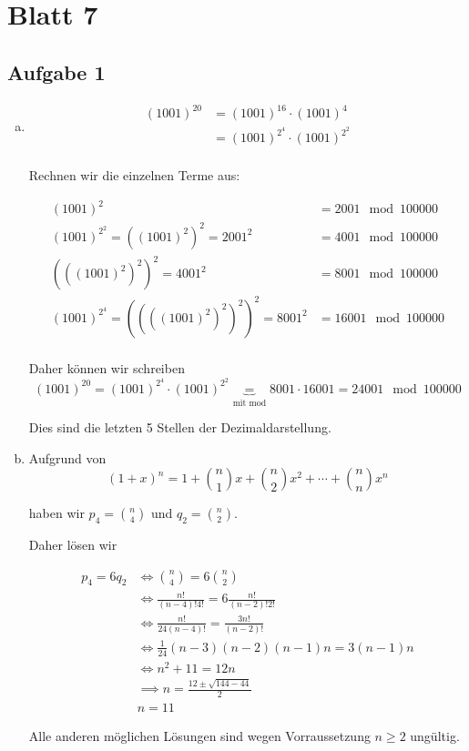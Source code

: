 \section*{Blatt 7}
%

\subsection*{Aufgabe 1}
\begin{enumerate}[a)]
\item
\begin{align*}
 (1001)^{20} &= (1001)^{16} \cdot (1001)^{4}\\
             &= (1001)^{2^{4}} \cdot (1001)^{2^{2}}\\
\end{align*}

Rechnen wir die einzelnen Terme aus:

\begin{align*}
  (1001)^2 &= 2001 \mod 100000 \\
  (1001)^{2^{2}} = ((1001)^2)^2 = 2001^2 &= 4001 \mod 100000 \\
  (((1001)^2)^2)^2 = 4001^2 &= 8001 \mod 100000 \\
  (1001)^{2^{4}} = ((((1001)^2)^2)^2)^2 = 8001^2 &= 16001 \mod 100000 \\
\end{align*}

Daher können wir schreiben
\[  (1001)^{20} = (1001)^{2^{4}} \cdot (1001)^{2^{2}} \underbrace{=}_{\text{mit mod}} 8001 \cdot 16001 = 24001 \mod 100000 \]

Dies sind die letzten 5 Stellen der Dezimaldarstellung.


\item

Aufgrund von \[ (1+x)^n = 1 + \binom{n}{1}x + \binom{n}{2}x^2 + \cdots + \binom{n}{n} x^n  \]

haben wir $p_4 = \binom{n}{4} $ und $q_2= \binom{n}{2}  $.

Daher lösen wir

\begin{align*}
p_4 = 6q_2 &\iff \binom{n}{4} = 6 \binom{n}{2} \\
           &\iff \frac{n!}{ (n-4)! 4! } =  6 \frac{n!}{(n-2)! 2!}\\
           &\iff \frac{n!}{24(n-4)!} = \frac{3n!}{(n-2)!} \\
           &\iff \frac{1}{24} (n-3)(n-2)(n-1)n = 3(n-1)n \\
           &\iff n^2 + 11 = 12n \\
           &\implies n = \frac{12 \pm \sqrt{144 - 44}}{2} \\
           &n = 11
\end{align*}

Alle anderen möglichen Lösungen sind wegen Vorraussetzung $n\geq 2$ ungültig.

\end{enumerate}



